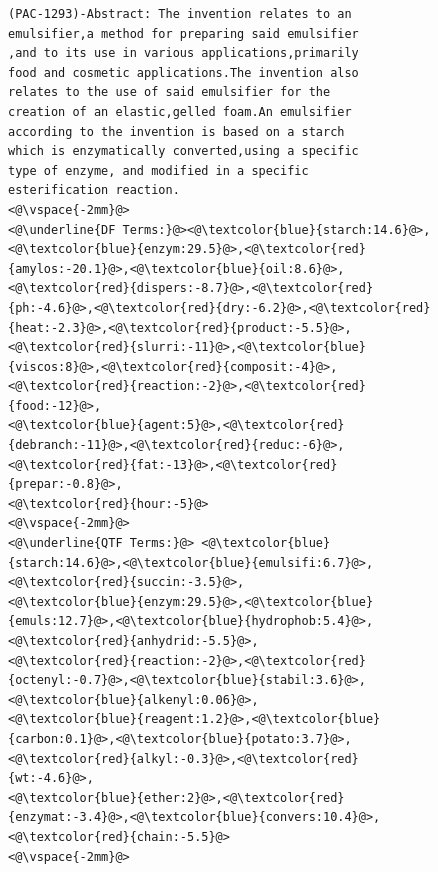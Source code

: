 \begin{figure}[t!]
\begin{framed}
\vspace*{-3ex}
  \centering
 \begin{lstlisting}[basicstyle=\scriptsize\ttfamily , linewidth=\columnwidth,breaklines=true] 
(PAC-1293)-Abstract: The invention relates to an 
emulsifier,a method for preparing said emulsifier
,and to its use in various applications,primarily 
food and cosmetic applications.The invention also 
relates to the use of said emulsifier for the 
creation of an elastic,gelled foam.An emulsifier 
according to the invention is based on a starch 
which is enzymatically converted,using a specific 
type of enzyme, and modified in a specific 
esterification reaction.
<@\vspace{-2mm}@>
<@\underline{DF Terms:}@><@\textcolor{blue}{starch:14.6}@>,<@\textcolor{blue}{enzym:29.5}@>,<@\textcolor{red}{amylos:-20.1}@>,<@\textcolor{blue}{oil:8.6}@>,
<@\textcolor{red}{dispers:-8.7}@>,<@\textcolor{red}{ph:-4.6}@>,<@\textcolor{red}{dry:-6.2}@>,<@\textcolor{red}{heat:-2.3}@>,<@\textcolor{red}{product:-5.5}@>,
<@\textcolor{red}{slurri:-11}@>,<@\textcolor{blue}{viscos:8}@>,<@\textcolor{red}{composit:-4}@>,<@\textcolor{red}{reaction:-2}@>,<@\textcolor{red}{food:-12}@>,
<@\textcolor{blue}{agent:5}@>,<@\textcolor{red}{debranch:-11}@>,<@\textcolor{red}{reduc:-6}@>,<@\textcolor{red}{fat:-13}@>,<@\textcolor{red}{prepar:-0.8}@>,
<@\textcolor{red}{hour:-5}@>
<@\vspace{-2mm}@>
<@\underline{QTF Terms:}@> <@\textcolor{blue}{starch:14.6}@>,<@\textcolor{blue}{emulsifi:6.7}@>,<@\textcolor{red}{succin:-3.5}@>,
<@\textcolor{blue}{enzym:29.5}@>,<@\textcolor{blue}{emuls:12.7}@>,<@\textcolor{blue}{hydrophob:5.4}@>,<@\textcolor{red}{anhydrid:-5.5}@>,
<@\textcolor{red}{reaction:-2}@>,<@\textcolor{red}{octenyl:-0.7}@>,<@\textcolor{blue}{stabil:3.6}@>,<@\textcolor{blue}{alkenyl:0.06}@>,
<@\textcolor{blue}{reagent:1.2}@>,<@\textcolor{blue}{carbon:0.1}@>,<@\textcolor{blue}{potato:3.7}@>,<@\textcolor{red}{alkyl:-0.3}@>,<@\textcolor{red}{wt:-4.6}@>,
<@\textcolor{blue}{ether:2}@>,<@\textcolor{red}{enzymat:-3.4}@>,<@\textcolor{blue}{convers:10.4}@>,<@\textcolor{red}{chain:-5.5}@>
<@\vspace{-2mm}@>

\end{lstlisting}
\end{framed}
\end{figure}
